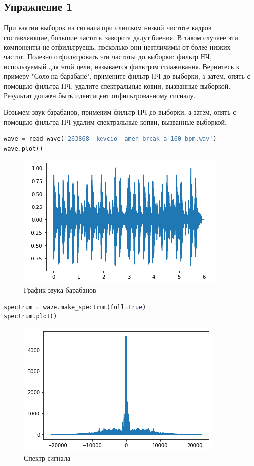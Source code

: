 \subsection{Упражнение 1}

При взятии выборок из сигнала при слишком низкой чистоте кадров составляющие, большие частоты заворота дадут биения. В таком случаее эти компоненты не отфильтруешь, посколько они неотличимы от более низких частот. Полезно отфильтровать эти частоты до выборки: фильтр НЧ, используемый для этой цели, называется фильтром сглаживания. Вернитесь к примеру "Соло на барабане", примените фильтр НЧ до выборки, а затем, опять с помощью фильтра НЧ, удалите спектральные копии, вызванные выборкой. Результат должен быть идентицент отфильтрованному сигналу.

Возьмем звук барабанов, применим фильтр НЧ до выборки, а затем, опять с помощью фильтра НЧ удалим спектральные копии, вызванные выборкой.

\begin{lstlisting}[language=Python]
wave = read_wave('263868__kevcio__amen-break-a-160-bpm.wav')
wave.plot()
\end{lstlisting}
\begin{figure}[H]
	\begin{center}
		\includegraphics[scale=1]{fig/lab11/lab11_1.png}
		\caption{График звука барабанов}
	\end{center}
\end{figure}

\begin{lstlisting}[language=Python]
spectrum = wave.make_spectrum(full=True)
spectrum.plot()
\end{lstlisting}
\begin{figure}[H]
	\begin{center}
		\includegraphics[scale=1]{fig/lab11/lab11_2.png}
		\caption{Спектр сигнала}
	\end{center}
\end{figure}


